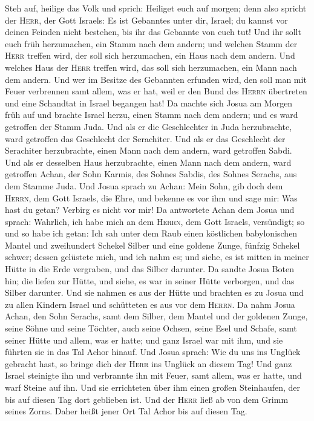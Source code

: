 Steh auf, heilige das Volk und sprich: Heiliget euch auf morgen; denn
also spricht der \textsc{Herr}, der Gott Israels: Es ist Gebanntes unter
dir, Israel; du kannst vor deinen Feinden nicht bestehen, bis ihr das
Gebannte von euch tut!  Und ihr sollt euch früh
herzumachen, ein Stamm nach dem andern; und welchen Stamm der
\textsc{Herr} treffen wird, der soll sich herzumachen, ein Haus nach dem
andern. Und welches Haus der \textsc{Herr} treffen wird, das soll sich
herzumachen, ein Mann nach dem andern.  Und wer im
Besitze des Gebannten erfunden wird, den soll man mit Feuer verbrennen
samt allem, was er hat, weil er den Bund des \textsc{Herrn} übertreten
und eine Schandtat in Israel begangen hat!  Da machte
sich Josua am Morgen früh auf und brachte Israel herzu, einen Stamm nach
dem andern; und es ward getroffen der Stamm Juda.  Und
als er die Geschlechter in Juda herzubrachte, ward getroffen das
Geschlecht der Serachiter. Und als er das Geschlecht der Serachiter
herzubrachte, einen Mann nach dem andern, ward getroffen Sabdi.
 Und als er desselben Haus herzubrachte, einen Mann nach
dem andern, ward getroffen Achan, der Sohn Karmis, des Sohnes Sabdis,
des Sohnes Serachs, aus dem Stamme Juda.  Und Josua
sprach zu Achan: Mein Sohn, gib doch dem \textsc{Herrn}, dem Gott
Israels, die Ehre, und bekenne es vor ihm und sage mir: Was hast du
getan? Verbirg es nicht vor mir!  Da antwortete Achan dem
Josua und sprach: Wahrlich, ich habe mich an dem \textsc{Herrn}, dem
Gott Israels, versündigt; so und so habe ich getan:  Ich
sah unter dem Raub einen köstlichen babylonischen Mantel und zweihundert
Schekel Silber und eine goldene Zunge, fünfzig Schekel schwer; dessen
gelüstete mich, und ich nahm es; und siehe, es ist mitten in meiner
Hütte in die Erde vergraben, und das Silber darunter.  Da
sandte Josua Boten hin; die liefen zur Hütte, und siehe, es war in
seiner Hütte verborgen, und das Silber darunter.  Und sie
nahmen es aus der Hütte und brachten es zu Josua und zu allen Kindern
Israel und schütteten es aus vor dem \textsc{Herrn}.  Da
nahm Josua Achan, den Sohn Serachs, samt dem Silber, dem Mantel und der
goldenen Zunge, seine Söhne und seine Töchter, auch seine Ochsen, seine
Esel und Schafe, samt seiner Hütte und allem, was er hatte; und ganz
Israel war mit ihm, und sie führten sie in das Tal Achor hinauf.
 Und Josua sprach: Wie du uns ins Unglück gebracht hast,
so bringe dich der \textsc{Herr} ins Unglück an diesem Tag! Und ganz
Israel steinigte ihn und verbrannte ihn mit Feuer, samt allem, was er
hatte, und warf Steine auf ihn.  Und sie errichteten über
ihm einen großen Steinhaufen, der bis auf diesen Tag dort geblieben ist.
Und der \textsc{Herr} ließ ab von dem Grimm seines Zorns. Daher heißt
jener Ort Tal Achor bis auf diesen Tag.

